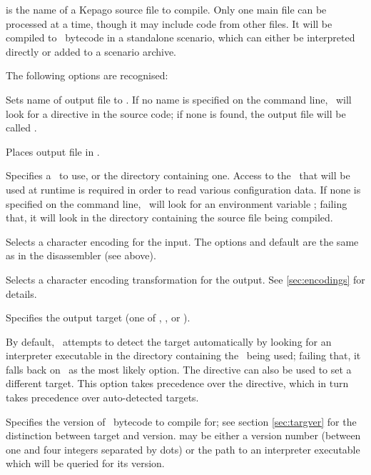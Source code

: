   \noindent{} is the name of a Kepago source file to compile.  Only
  one main file can be processed at a time, though it may include code from other
  files.  It will be compiled to \reallive\ bytecode in a standalone scenario, 
  which can either be interpreted directly or added to a scenario archive.

  The following options are recognised:

  \begin{nicelist}
  \item[\clbarg{o}{output}{FILE}]
    Sets name of output file to .  If no name is specified on the
    command line, \compiler\ will look for a  directive in the
    source code; if none is found, the output file will be called
    .
  \item[\clbarg{d}{outdir}{DIR}]
    Places output file in .
  \item[\clbarg{i}{ini}{FILE}]\label{usage:inifile}
    Specifies a \gameexe\ to use, or the directory containing one.  Access to 
    the \gameexe\ that will be used at runtime is required in order to read 
    various configuration data.  If none is specified on the command line, 
    \compiler\ will look for an environment variable ; failing 
    that, it will look in the directory containing the source file being 
    compiled.    
  \item[\clbarg{e}{encoding}{ENC}]
    Selects a character encoding for the input.  The options and default are the
    same as in the disassembler (see above).
  \item[\clbarg{x}{transform-output}{ENC}]
    Selects a character encoding transformation for the output. See 
    \ref{sec:encodings} for details.
  \item[\clbarg{t}{target}{TARGET}]
    Specifies the output target (one of , , or
    ).
    
    By default, \compiler\ attempts to detect the target automatically by 
    looking for an interpreter executable in the directory containing the 
    \gameexe\ being used; failing that, it falls back on \reallive\ as the 
    most likely option.  The  directive can also be used to set a 
    different target.  This option takes precedence over the directive, which in 
    turn takes precedence over auto-detected targets.
  \item[\clbarg{f}{target-version}{VER}]
    Specifies the version of \reallive\ bytecode to compile for; see section
    \ref{sec:targver} for the distinction between target and version.  
    may be either a version number (between one and four integers separated by
    dots) or the path to an interpreter executable which will be queried for
    its version.
    

\end{nicelist}

